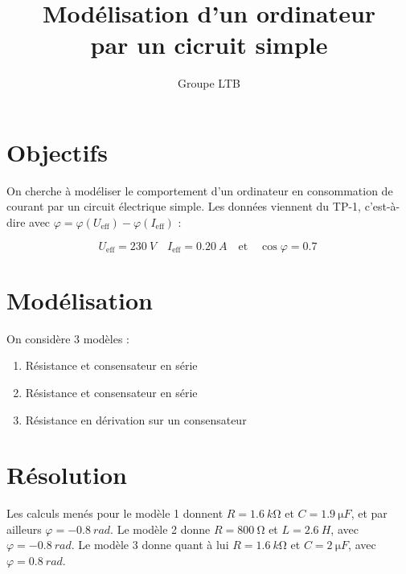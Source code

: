 \documentclass{article}
\title{Modélisation d'un ordinateur\\
\small{par un cicruit simple}}
\author{Groupe LTB}
\newcommand{\eff}{_\text{eff}}
\begin{document}
\maketitle

\section{Objectifs}

On cherche à modéliser le comportement d'un ordinateur en consommation de courant par un circuit électrique simple. Les données viennent du TP-1, c'est-à-dire avec $\varphi = \varphi(U\eff) - \varphi(I\eff)$ :

$$U\eff = \SI{230}{V} \quad I\eff = \SI{0,20}{A} \quad \text{et} \quad \cos \varphi = \SI{0,7}{}$$

\section{Modélisation}

On considère 3 modèles :
\begin{enumerate}
    \item Résistance et consensateur en série
    \item Résistance et consensateur en série
    \item Résistance en dérivation sur un consensateur
\end{enumerate}

\section{Résolution}

Les calculs menés pour le modèle 1 donnent $R = \SI{1,6}{k\ohm}$ et $C = \SI{1,9}{\micro F}$, et par ailleurs $\varphi = \SI{-0,8}{rad}$.
Le modèle 2 donne $R = \SI{800}{\ohm}$ et $L = \SI{2,6}{H}$, avec $\varphi = \SI{-0,8}{rad}$.
Le modèle 3 donne quant à lui $R = \SI{1,6}{k\ohm}$ et $C = \SI{2}{\micro F}$, avec $\varphi = \SI{0,8}{rad}$.
\end{document}
